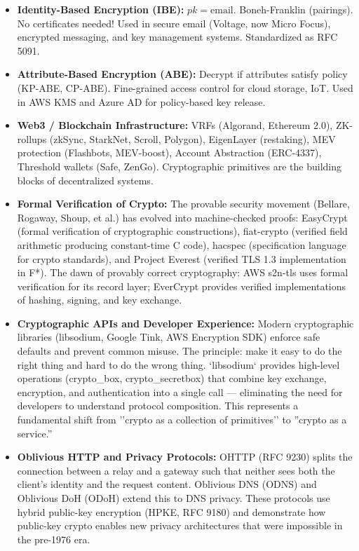 \begin{itemize}
\item \textbf{Identity-Based Encryption (IBE):} $pk = \text{email}$. Boneh-Franklin (pairings). No certificates needed! Used in secure email (Voltage, now Micro Focus), encrypted messaging, and key management systems. Standardized as RFC 5091.

\item \textbf{Attribute-Based Encryption (ABE):} Decrypt if attributes satisfy policy (KP-ABE, CP-ABE). Fine-grained access control for cloud storage, IoT. Used in AWS KMS and Azure AD for policy-based key release.

\item \textbf{Web3 / Blockchain Infrastructure:} VRFs (Algorand, Ethereum 2.0), ZK-rollups (zkSync, StarkNet, Scroll, Polygon), EigenLayer (restaking), MEV protection (Flashbots, MEV-boost), Account Abstraction (ERC-4337), Threshold wallets (Safe, ZenGo). Cryptographic primitives are the building blocks of decentralized systems.

\item \textbf{Formal Verification of Crypto:} The provable security movement (Bellare, Rogaway, Shoup, et al.) has evolved into machine-checked proofs: EasyCrypt (formal verification of cryptographic constructions), fiat-crypto (verified field arithmetic producing constant-time C code), hacspec (specification language for crypto standards), and Project Everest (verified TLS 1.3 implementation in F*). The dawn of provably correct cryptography: AWS s2n-tls uses formal verification for its record layer; EverCrypt provides verified implementations of hashing, signing, and key exchange.

\item \textbf{Cryptographic APIs and Developer Experience:} Modern cryptographic libraries (libsodium, Google Tink, AWS Encryption SDK) enforce safe defaults and prevent common misuse. The principle: make it easy to do the right thing and hard to do the wrong thing. `libsodium` provides high-level operations (crypto\_box, crypto\_secretbox) that combine key exchange, encryption, and authentication into a single call — eliminating the need for developers to understand protocol composition. This represents a fundamental shift from ''crypto as a collection of primitives'' to ''crypto as a service.''

\item \textbf{Oblivious HTTP and Privacy Protocols:} OHTTP (RFC 9230) splits the connection between a relay and a gateway such that neither sees both the client's identity and the request content. Oblivious DNS (ODNS) and Oblivious DoH (ODoH) extend this to DNS privacy. These protocols use hybrid public-key encryption (HPKE, RFC 9180) and demonstrate how public-key crypto enables new privacy architectures that were impossible in the pre-1976 era.


\end{itemize}
